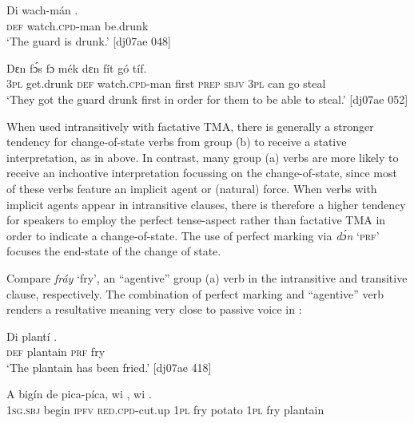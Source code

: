 \ea%
    \label{ex:key:1110}
    \gll Di  wach-mán    .\\
\textsc{def}  watch.\textsc{cpd}{}-man  be.drunk\\

\glt ‘The guard is drunk.’ [dj07ae 048]
\z


\ea%
    \label{ex:key:1111}
    \gll Dɛn              fɔ́s  fɔ  mék
dɛn  fít  gó  tíf.\\
\textsc{3pl}    get.drunk  \textsc{def}  watch.\textsc{cpd}{}-man  first  \textsc{prep}  \textsc{sbjv}  
\textsc{3pl}  can  go  steal\\

\glt ‘They got the guard drunk first in order for them to be able to steal.’ [dj07ae 052]
\z

When used intransitively with factative TMA, there is generally a stronger tendency for change-of-state verbs from group (b) to receive a stative interpretation, as in  above. In contrast, many group (a) verbs are more likely to receive an inchoative interpretation focussing on the change-of-state, since most of these verbs feature an implicit agent or (natural) force. When verbs with implicit agents appear in intransitive clauses, there is therefore a higher tendency for speakers to employ the perfect tense-aspect rather than factative TMA in order to indicate a change-of-state. The use of perfect marking via \textit{dɔ́n} ‘\textsc{prf}’ focuses the end-state of the change of state. 


Compare \textit{fráy} ‘fry’, an “agentive” group (a) verb in the intransitive and transitive clause, respectively. The combination of perfect marking and “agentive” verb renders a resultative meaning very close to passive voice in : 



\ea%
    \label{ex:key:1112}
    \gll Di  plantí    .\\
\textsc{def}  plantain  \textsc{prf}  fry\\

\glt ‘The plantain has been fried.’ [dj07ae 418]
\z


\ea%
    \label{ex:key:1113}
    \gll A    bigín  de  pica-píca,    wi    ,
wi    .\\
\textsc{1sg.sbj}  begin  \textsc{ipfv}  \textsc{red.cpd}{}-cut.up  \textsc{1pl}  fry  potato
\textsc{1pl}  fry  plantain\\

